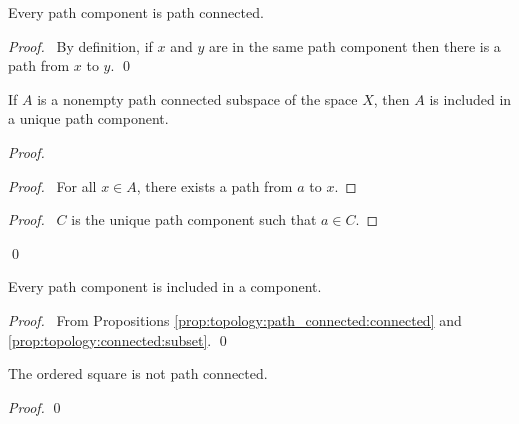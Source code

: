 \begin{prop}
  Every path component is path connected.
\end{prop}

\begin{proof}
  \pf\ By definition, if $x$ and $y$ are in the same path component then
  there
  is a path from $x$ to $y$. \qed
\end{proof}

\begin{prop}
  \label{prop:topology:path_connected:subset}
  If $A$ is a nonempty path connected subspace of the space $X$, then $A$ is
  included in a unique path component.
\end{prop}

\begin{proof}
  \pf
  \begin{proof}
    \pf\ For all $x \in A$, there exists a path from $a$ to $x$.
  \end{proof}
  \begin{proof}
    \pf\ $C$ is the unique path component such that $a \in C$.
  \end{proof}
  \qed
\end{proof}

\begin{prop}
  Every path component is included in a component.
\end{prop}

\begin{proof}
  \pf\ From Propositions \ref{prop:topology:path_connected:connected} and
  \ref{prop:topology:connected:subset}. \qed
\end{proof}

 \begin{prop}
The ordered square is not path connected.
\end{prop}

\begin{proof}
\pf
{}
\qed
\end{proof}

